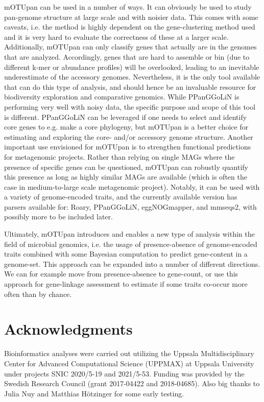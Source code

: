 \documentclass{article}
\begin{document}
mOTUpan can be used in a number of ways. It can obviously be used to study pan-genome structure at large scale and with noisier data. This comes with some caveats, i.e. the method is highly dependent on the gene-clustering method used and it is very hard to evaluate the correctness of these at a larger scale. Additionally, mOTUpan can only classify genes that actually are in the genomes that are analyzed. Accordingly,  genes that are hard to assemble or bin (due to different k-mer or abundance profiles) will be overlooked, leading to an inevitable underestimate of the accessory genomes. Nevertheless, it is the only tool available that can do this type of analysis, and should hence be an invaluable resource for biodiversity exploration and comparative genomics. While PPanGGoLiN is performing very well with noisy data, the specific purpose and scope of this tool is different. PPanGGoLiN can be leveraged if one needs to select and identify core genes to e.g. make a core phylogeny, but mOTUpan is a better choice for estimating and exploring the core-  and/or accessory genome structure.
Another important use envisioned for mOTUpan is to strengthen functional predictions for metagenomic projects. Rather than relying on single MAGs where the presence of specific genes can be questioned, mOTUpan can robustly quantify this presence as long as highly similar MAGs are available (which is often the case in medium-to-large scale metagenomic project). Notably, it can be used with a variety of genome-encoded traits, and the currently available version has parsers available for: Roary, PPanGGoLiN, eggNOGmapper\citep{cantalapiedra_2021}, and mmseqs2\citep{steinegger_2017}, with possibly more to be included later.

Ultimately, mOTUpan introduces and enables a new type of analysis within the field of microbial genomics, i.e. the usage of presence-absence of genome-encoded traits combined with some Bayesian computation to predict gene-content in a genome-set. This approach can be expanded into a number of different directions. We can for example move from presence-absence to gene-count, or use this approach for gene-linkage assessment to estimate if some traits co-occur more often than by chance.

\section*{Acknowledgments}

Bioinformatics analyses were carried out utilizing the Uppsala Multidisciplinary Center for Advanced Computational Science (UPPMAX) at Uppsala University under projects SNIC 2020/5-19 and 2021/5-53. Funding was provided by the Swedish Research Council (grant 2017-04422 and 2018-04685). Also big thanks to Julia Nuy and Matthias Hötzinger for some early testing.
\end{document}
